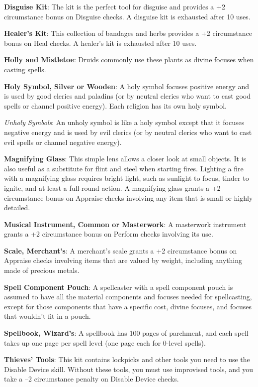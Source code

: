 \textbf{Disguise Kit}: The kit is the perfect tool for disguise and provides a +2 circumstance bonus on Disguise checks. A disguise kit is exhausted after 10 uses.
		
\textbf{Healer's Kit}: This collection of bandages and herbs provides a +2 circumstance bonus on Heal checks. A healer's kit is exhausted after 10 uses.
		
\textbf{Holly and Mistletoe}: Druids commonly use these plants as divine focuses when casting spells.
		
\textbf{Holy Symbol, Silver or Wooden}: A holy symbol focuses positive energy and is used by good clerics and paladins (or by neutral clerics who want to cast good spells or channel positive energy). Each religion has its own holy symbol.
		
\textit{Unholy Symbols}: An unholy symbol is like a holy symbol except that it focuses negative energy and is used by evil clerics (or by neutral clerics who want to cast evil spells or channel negative energy).
		
\textbf{Magnifying Glass}: This simple lens allows a closer look at small objects. It is also useful as a substitute for flint and steel when starting fires. Lighting a fire with a magnifying glass requires bright light, such as sunlight to focus, tinder to ignite, and at least a full-round action. A magnifying glass grants a +2 circumstance bonus on Appraise checks involving any item that is small or highly detailed.
		
\textbf{Musical Instrument, Common or Masterwork}: A masterwork instrument grants a +2 circumstance bonus on Perform checks involving its use.
		
\textbf{Scale, Merchant's}: A merchant's scale grants a +2 circumstance bonus on Appraise checks involving items that are valued by weight, including anything made of precious metals.
		
\textbf{Spell Component Pouch}: A spellcaster with a spell component pouch is assumed to have all the material components and focuses needed for spellcasting, except for those components that have a specific cost, divine focuses, and focuses that wouldn't fit in a pouch.
		
\textbf{Spellbook, Wizard's}: A spellbook has 100 pages of parchment, and each spell takes up one page per spell level (one page each for 0-level spells).
		
\textbf{Thieves' Tools}: This kit contains lockpicks and other tools you need to use the Disable Device skill. Without these tools, you must use improvised tools, and you take a --2 circumstance penalty on Disable Device checks.
		
